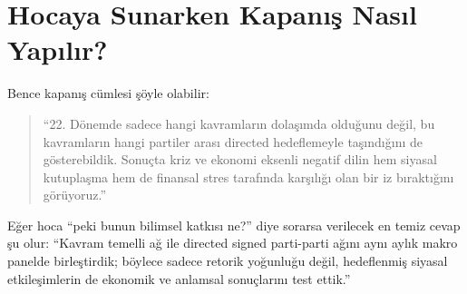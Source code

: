\documentclass[conference]{IEEEtran}
\begin{document}
\section{Hocaya Sunarken Kapan{\i}\c{s} Nas{\i}l Yap{\i}l{\i}r?}
Bence kapan{\i}\c{s} c\"umlesi \c{s}\"oyle olabilir:

\begin{quote}
``22. D\"onemde sadece hangi kavramlar{\i}n dola\c{s}{\i}mda oldu\u{g}unu de\u{g}il, bu kavramlar{\i}n hangi partiler aras{\i} directed hedeflemeyle ta\c{s}{\i}nd{\i}\u{g}{\i}n{\i} de g\"osterebildik. Sonu\c{c}ta kriz ve ekonomi eksenli negatif dilin hem siyasal kutupla\c{s}ma hem de finansal stres taraf{\i}nda kar\c{s}{\i}l{\i}\u{g}{\i} olan bir iz b{\i}rakt{\i}\u{g}{\i}n{\i} g\"or\"uyoruz.'' 
\end{quote}

E\u{g}er hoca ``peki bunun bilimsel katk{\i}s{\i} ne?'' diye sorarsa verilecek en temiz cevap \c{s}u olur: ``Kavram temelli a\u{g} ile directed signed parti-parti a\u{g}{\i}n{\i} ayn{\i} ayl{\i}k makro panelde birle\c{s}tirdik; b\"oylece sadece retorik yo\u{g}unlu\u{g}u de\u{g}il, hedeflenmi\c{s} siyasal etkile\c{s}imlerin de ekonomik ve anlamsal sonu\c{c}lar{\i}n{\i} test ettik.''
\end{document}
